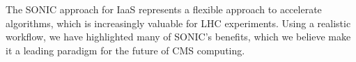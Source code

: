 The SONIC approach for IaaS represents a flexible approach to accelerate algorithms, which is increasingly valuable for LHC experiments. Using a realistic workflow, we have highlighted many of SONIC's benefits, which we believe make it a leading paradigm for the future of CMS computing.



